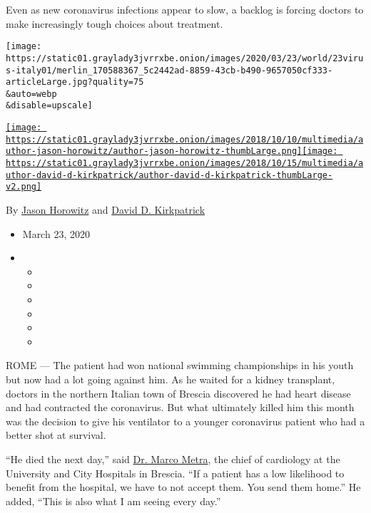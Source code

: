 Even as new coronavirus infections appear to slow, a backlog is forcing
doctors to make increasingly tough choices about treatment.

\texttt{[image: https://static01.graylady3jvrrxbe.onion/images/2020/03/23/world/23virus-italy01/merlin\_170588367\_5c2442ad-8859-43cb-b490-9657050cf333-articleLarge.jpg?quality=75\\\&auto=webp\\\&disable=upscale]}

\href{https://www.nytimes3xbfgragh.onion/by/jason-horowitz}{\texttt{[image: https://static01.graylady3jvrrxbe.onion/images/2018/10/10/multimedia/author-jason-horowitz/author-jason-horowitz-thumbLarge.png]}}\href{https://www.nytimes3xbfgragh.onion/by/david-d-kirkpatrick}{\texttt{[image: https://static01.graylady3jvrrxbe.onion/images/2018/10/15/multimedia/author-david-d-kirkpatrick/author-david-d-kirkpatrick-thumbLarge-v2.png]}}

By \href{https://www.nytimes3xbfgragh.onion/by/jason-horowitz}{Jason
Horowitz} and
\href{https://www.nytimes3xbfgragh.onion/by/david-d-kirkpatrick}{David
D. Kirkpatrick}

\begin{itemize}
\item
  March 23, 2020
\item
  \begin{itemize}
  \item
  \item
  \item
  \item
  \item
  \item
  \end{itemize}
\end{itemize}

ROME --- The patient had won national swimming championships in his
youth but now had a lot going against him. As he waited for a kidney
transplant, doctors in the northern Italian town of Brescia discovered
he had heart disease and had contracted the coronavirus. But what
ultimately killed him this month was the decision to give his ventilator
to a younger coronavirus patient who had a better shot at survival.

``He died the next day,'' said
\href{https://esc365.escardio.org/Person/1510-prof-metra-marco}{Dr.
Marco Metra}, the chief of cardiology at the University and City
Hospitals in Brescia. ``If a patient has a low likelihood to benefit
from the hospital, we have to not accept them. You send them home.'' He
added, ``This is also what I am seeing every day.''

